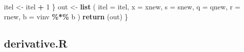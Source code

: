 \documentclass[
  12pt,
]{article}
\newenvironment{Shaded}{\begin{snugshade}}{\end{snugshade}}
\newcommand{\AttributeTok}[1]{\textcolor[rgb]{0.13,0.29,0.53}{#1}}
\newcommand{\DecValTok}[1]{\textcolor[rgb]{0.00,0.00,0.81}{#1}}
\newcommand{\FunctionTok}[1]{\textcolor[rgb]{0.13,0.29,0.53}{\textbf{#1}}}
\newcommand{\NormalTok}[1]{#1}
\newcommand{\OtherTok}[1]{\textcolor[rgb]{0.56,0.35,0.01}{#1}}
\newcommand{\SpecialCharTok}[1]{\textcolor[rgb]{0.81,0.36,0.00}{\textbf{#1}}}
\begin{document}
\begin{Shaded}
\begin{Highlighting}[]
\NormalTok{      itel }\OtherTok{\textless{}{-}}\NormalTok{ itel }\SpecialCharTok{+} \DecValTok{1}
\NormalTok{    \}}
\NormalTok{    out }\OtherTok{\textless{}{-}}
      \FunctionTok{list}\NormalTok{ (}
        \AttributeTok{itel =}\NormalTok{ itel,}
        \AttributeTok{x =}\NormalTok{ xnew,}
        \AttributeTok{s =}\NormalTok{ snew,}
        \AttributeTok{q =}\NormalTok{ qnew,}
        \AttributeTok{r =}\NormalTok{ rnew,}
        \AttributeTok{b =}\NormalTok{ vinv }\SpecialCharTok{\%*\%}\NormalTok{ b}
\NormalTok{      )}
    \FunctionTok{return}\NormalTok{ (out)}
\NormalTok{  \}}
\end{Highlighting}
\end{Shaded}

\subsection{derivative.R}\label{derivative.r}
\end{document}
